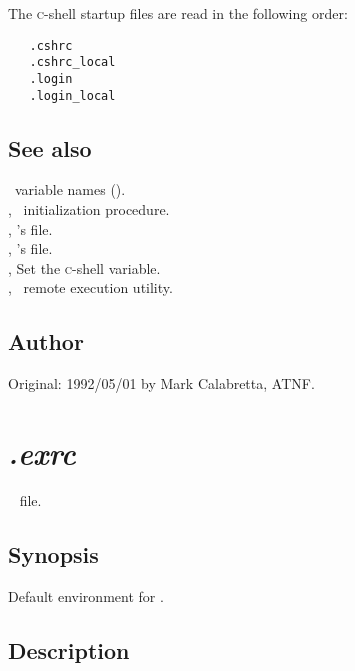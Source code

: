 The \textsc{c}-shell startup files are read in the following order:

\begin{verbatim}
   .cshrc
   .cshrc_local
   .login
   .login_local
\end{verbatim}

\subsection*{See also}

\aipspp\ variable names ().\\
, \aipspp\ initialization procedure.\\
, 's  file.\\
, 's  file.\\
, Set the \textsc{c}-shell  variable.\\
, \aipspp\ remote execution utility.

\subsection*{Author}

Original: 1992/05/01 by Mark Calabretta, ATNF.


\newpage
\section{\textit{.exrc}}
\label{.exrc}




\aipspp\  file.

\subsection*{Synopsis}

\begin{synopsis}
   Default environment for .
\end{synopsis}

\subsection*{Description}

